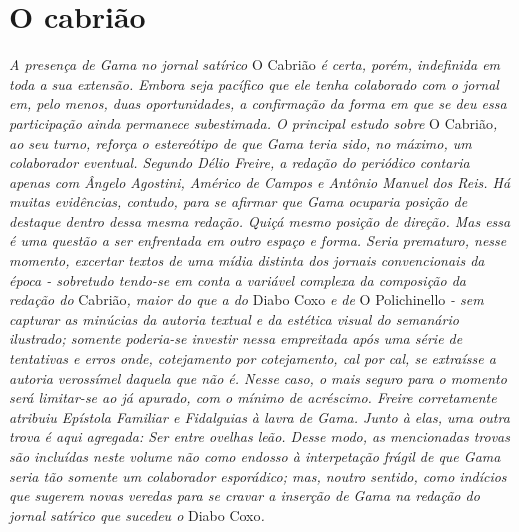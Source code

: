 
\part{O cabrião} %

\begin{argumento}
\emph{A presença de Gama no jornal satírico} O Cabrião \emph{é certa,
porém, indefinida em toda a sua extensão. Embora seja pacífico que ele
tenha colaborado com o jornal em, pelo menos, duas oportunidades, a
confirmação da forma em que se deu essa participação ainda permanece
subestimada. O principal estudo sobre} O Cabrião\emph{, ao seu turno,
reforça o estereótipo de que Gama teria sido, no máximo, um colaborador
eventual. Segundo Délio Freire, a redação do periódico contaria apenas
com Ângelo Agostini, Américo de Campos e Antônio Manuel dos Reis. Há
muitas evidências, contudo, para se afirmar que Gama ocuparia posição de
destaque dentro dessa mesma redação. Quiçá mesmo posição de direção. Mas
essa é uma questão a ser enfrentada em outro espaço e forma. Seria
prematuro, nesse momento, excertar textos de uma mídia distinta dos
jornais convencionais da época - sobretudo tendo-se em conta a variável
complexa da composição da redação do} Cabrião\emph{, maior do que a do}
Diabo Coxo \emph{e de} O Polichinello \emph{- sem capturar as minúcias
da autoria textual e da estética visual do semanário ilustrado; somente
poderia-se investir nessa empreitada após uma série de tentativas e
erros onde, cotejamento por cotejamento, cal por cal, se extraísse a
autoria verossímel daquela que não é. Nesse caso, o mais seguro para o
momento será limitar-se ao já apurado, com o mínimo de acréscimo. Freire
corretamente atribuiu Epístola Familiar e Fidalguias à lavra de Gama.
Junto à elas, uma outra trova é aqui agregada: Ser entre ovelhas leão.
Desse modo, as mencionadas trovas são incluídas neste volume não como
endosso à interpetação frágil de que Gama seria tão somente um
colaborador esporádico; mas, noutro sentido, como indícios que sugerem
novas veredas para se cravar a inserção de Gama na redação do jornal
satírico que sucedeu o} Diabo Coxo\emph{.}
\end{argumento}


